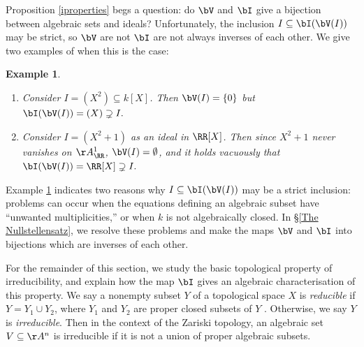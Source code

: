 \documentclass[12pt]{amsart}
\theoremstyle{plain}
\newtheorem{example}[theorem]{Example}
\begin{document}
Proposition \ref{iproperties} begs a question: do $\bV$ and $\bI$ give a bijection between algebraic sets and ideals?
Unfortunately, the inclusion $I \subseteq \bI(\bV(I))$ may be strict, so $\bV$ are not $\bI$ are not always inverses of each other.
We give two examples of when this is the case:

\begin{example}\label{inclfails}
\begin{enumerate}
\item
Consider $I = (X^2) \subseteq k[X]$.
Then $\bV(I) = \{0\}$ but $\bI(\bV(I)) = (X) \supsetneq I.$

\item
Consider $I = (X^2+1)$ as an ideal in $\RR[X]$.
Then since $X^2+1$ never vanishes on $\AA^1_\RR$, $\bV(I) = \emptyset$, and it holds vacuously that $\bI(\bV(I)) = \RR[X] \supsetneq I.$
\end{enumerate}
\end{example}

Example \ref{inclfails} indicates two reasons why $I \subseteq \bI(\bV(I))$ may be a strict inclusion:
problems can occur when the equations defining an algebraic subset have ``unwanted multiplicities,'' or when $k$ is not algebraically closed.
In \S \ref{The Nullstellensatz}, we resolve these problems and make the maps $\bV$ and $\bI$ into bijections which are inverses of each other.

For the remainder of this section, we study the basic topological property of irreducibility, and explain how the map $\bI$ gives an algebraic characterisation of this property.
We say a nonempty subset $Y$ of a topological space $X$ is \emph{reducible} if $Y = Y_1 \cup Y_2$, where $Y_1$ and $Y_2$ are proper closed subsets of $Y$ \cite[Chapter I]{Hartshorne77}.
Otherwise, we say $Y$ is \emph{irreducible}.
Then in the context of the Zariski topology, an algebraic set $V \subseteq \AA^n$ is irreducible if it is not a union of proper algebraic subsets.
\end{document}
